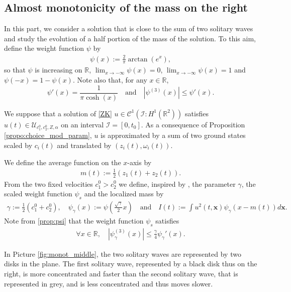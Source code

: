 \documentclass[reqno,10pt]{amsart}
\numberwithin{equation}{section}
\newcommand{\bx}{\mathbf{x}}
\begin{document}
	\subsection{Almost monotonicity of the mass on the right}\label{sec:mass_right}

 In this part, we consider a solution that is close to the sum of two solitary waves and study the evolution of a half portion of the mass of the solution. To this aim, define the weight function $\psi$ by
 \begin{align}
 \psi(x) := \frac{2}{\pi}\arctan (e^x), \label{defi:psi}
 \end{align}
so that $\psi$ is increasing on $\mathbb R$, $\lim_{x\to -\infty}\psi(x)=0$, $\lim_{x\to -\infty}\psi(x)=1$ and $\psi(-x)=1-\psi(x)$. Note also that, for any $x \in \mathbb R$, 
\begin{equation} \label{prop:psi}
\psi' (x)=\frac1{\pi \cosh (x)} \quad \text{and} \quad |\psi^{(3)}(x)| \le \psi' (x) .
\end{equation}
 
We suppose that a solution of \eqref{ZK} $u\in\mathcal{C}^1(\mathcal{I}:H^1(\mathbb{R}^2))$ satisfies $u(t) \in \mathcal{U}_{c_1^ 0,c_2^ 0,Z,\alpha}$ on an interval $\mathcal{I}=[0,t_0]$. As a consequence of Proposition \ref{propo:choice_mod_param}, $u$ is approximated by a sum of two ground states scaled by $c_i(t)$ and translated by $(z_i(t),\omega_i(t))$.  

We define the average function on the $x$-axis by 
	\begin{align}\label{defi:m}
		m(t) := \frac12 \left( z_1(t) + z_2(t)\right). 
	\end{align}
From the two fixed velocities $c_1^0>c_2^0$ we define, inspired by \cite{MMT02, CMPS16}, the parameter $\gamma$, the scaled weight function $\psi_s$ and the localized mass by
		\begin{align}\label{defi:orbital_stab}
		\gamma:=\frac12 \left( c_1^0 + c_2^0\right), \quad \psi_\gamma(x) := \psi \left( \frac{\sqrt{\gamma}}{2} x \right) \quad \text{and} \quad I(t) := \int u^2(t,\bx) \psi_{\gamma} \left( x - m(t)\right) d\bx. 
		\end{align}
Note from \eqref{prop:psi} that the weight function $\psi_s$ satisfies
		\begin{align}\label{eq:psi3}
			\forall x \in \mathbb{R}, \quad \left\vert \psi_\gamma^{(3)}(x) \right\vert \leq \frac{\gamma}{4} \psi_\gamma'(x).
		\end{align}
  
	In Picture \ref{fig:monot_middle}, the two solitary waves are represented by two disks in the plane. The first solitary wave, represented by a black disk thus on the right, is more concentrated and faster than the second solitary wave, that is represented in grey, and is less concentrated and thus moves slower.
  
\end{document}
